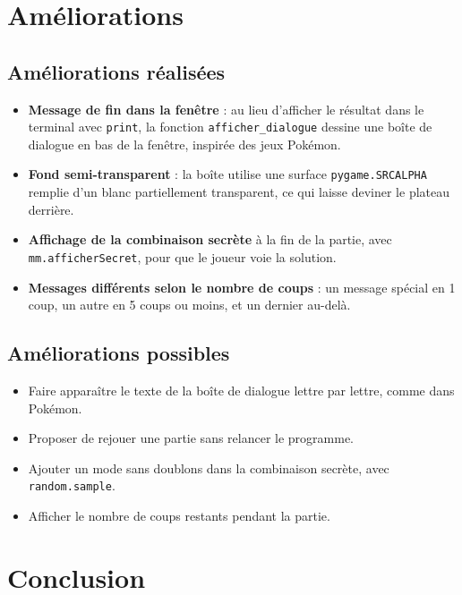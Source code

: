 \documentclass[11pt,a4paper]{article}
\begin{document}
\section{Améliorations}

\subsection*{Améliorations réalisées}

\begin{itemize}
    \item \textbf{Message de fin dans la fenêtre} : au lieu d'afficher le résultat dans le terminal avec \texttt{print}, la fonction \texttt{afficher\_dialogue} dessine une boîte de dialogue en bas de la fenêtre, inspirée des jeux Pokémon.
    \item \textbf{Fond semi-transparent} : la boîte utilise une surface \texttt{pygame.SRCALPHA} remplie d'un blanc partiellement transparent, ce qui laisse deviner le plateau derrière.
    \item \textbf{Affichage de la combinaison secrète} à la fin de la partie, avec \texttt{mm.afficherSecret}, pour que le joueur voie la solution.
    \item \textbf{Messages différents selon le nombre de coups} : un message spécial en 1 coup, un autre en 5 coups ou moins, et un dernier au-delà.
\end{itemize}

\subsection*{Améliorations possibles}

\begin{itemize}
    \item Faire apparaître le texte de la boîte de dialogue lettre par lettre, comme dans Pokémon.
    \item Proposer de rejouer une partie sans relancer le programme.
    \item Ajouter un mode sans doublons dans la combinaison secrète, avec \texttt{random.sample}.
    \item Afficher le nombre de coups restants pendant la partie.
\end{itemize}

\section{Conclusion}

\end{document}
